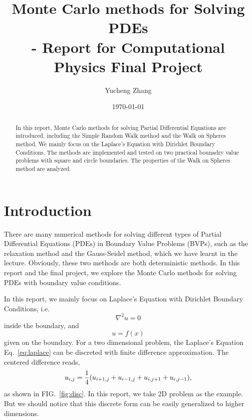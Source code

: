 \documentclass[aps, prl, preprint, groupedaddress]{revtex4-1}
\begin{document}
    
\title{Monte Carlo methods for Solving PDEs\\- Report for Computational Physics Final Project}
\author{Yucheng Zhang}
\date{\today}
    
\begin{abstract}
    In this report, Monte Carlo methods for solving Partial Differential Equations are introduced, including the Simple Random Walk method and the Walk on Spheres method. We mainly focus on the Laplace's Equation with Dirichlet Boundary Conditions. The methods are implemented and tested on two practical bounadry value problems with square and circle boundaries. The properties of the Walk on Spheres method are analyzed.
\end{abstract}
    
\maketitle

\section{Introduction}

There are many numerical methods for solving different types of Partial Differential Equations (PDEs) in Boundary Value Problems (BVPs), such as the relaxation method and the Gauss-Seidel method, which we have learnt in the lecture. Obviously, these two methods are both deterministic methods. In this report and the final project, we explore the Monte Carlo methods for solving PDEs with boundary value conditions. 

In this report, we mainly focus on Laplace's Equation with Dirichlet Boundary Conditions, i.e.
\begin{equation}
    \nabla^2 u = 0
    \label{eq:laplace}
\end{equation} inside the boundary, and
\begin{equation}
    u = f(x)
\end{equation} given on the boundary. For a two dimensional problem, the Laplace's Equation Eq.~\ref{eq:laplace} can be discreted with finite difference approximation. The centered difference reads,
\begin{equation}
    u_{i,j} = \frac{1}{4} \qty(u_{i+1,j}+u_{i-1,j}+u_{i,j+1}+u_{i,j-1}),
\end{equation}
as shown in FIG.~\ref{fig:disc}. In this report, we take 2D problem as the example. But we should notice that this discrete form can be easily generalized to higher dimensions.
\end{document}
